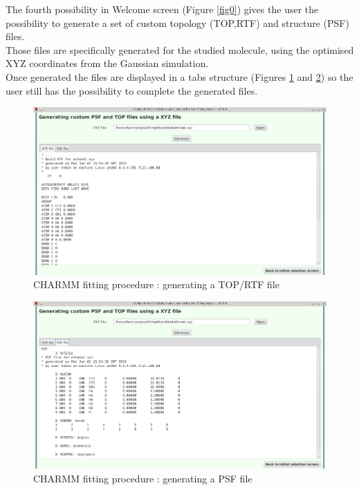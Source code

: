 \documentclass[12pt,a4paper]{article}
\begin{document}
The fourth possibility in Welcome screen (Figure \ref{fig0}) gives the user the possibility to 
generate a set of custom topology (TOP,RTF) and structure (PSF) files.\\

Those files are specifically generated for the studied molecule, using the optimised XYZ 
coordinates from the Gaussian simulation.\\

Once generated the files are displayed in a tabs structure (Figures \ref{fig15} and \ref{fig16})
so the user still has the possibility to complete the generated files.

\begin{figure}[h!]
\centering
\includegraphics[width=0.9\linewidth]{pics/scr15}
\caption{CHARMM fitting procedure : generating a TOP/RTF file}
\label{fig15}
\end{figure}

\begin{figure}[h!]
\centering
\includegraphics[width=0.9\linewidth]{pics/scr16}
\caption{CHARMM fitting procedure : generating a PSF file}
\label{fig16}
\end{figure}


\clearpage
\end{document}
